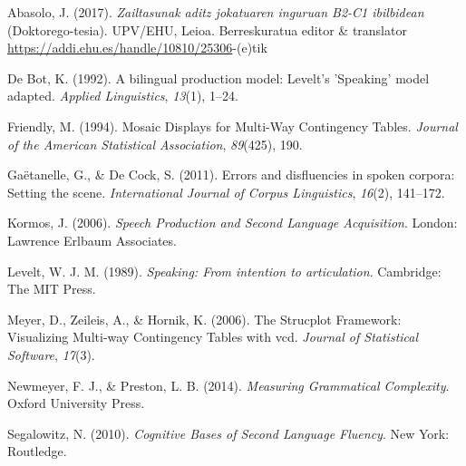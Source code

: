 \documentclass[]{article}
\begin{document}
\hypertarget{ref-abasolo_zailtasunak_2017}{}
Abasolo, J. (2017). \emph{Zailtasunak aditz jokatuaren inguruan B2-C1
ibilbidean} (Doktorego-tesia). UPV/EHU, Leioa. Berreskuratua editor \&
translator \url{https://addi.ehu.es/handle/10810/25306}-(e)tik

\hypertarget{ref-de_bot_bilingual_1992}{}
De Bot, K. (1992). A bilingual production model: Levelt's 'Speaking'
model adapted. \emph{Applied Linguistics}, \emph{13}(1), 1--24.

\hypertarget{ref-friendly_mosaic_1994}{}
Friendly, M. (1994). Mosaic Displays for Multi-Way Contingency Tables.
\emph{Journal of the American Statistical Association}, \emph{89}(425),
190.

\hypertarget{ref-gaetanelle_errors_2011}{}
Gaëtanelle, G., \& De Cock, S. (2011). Errors and disfluencies in spoken
corpora: Setting the scene. \emph{International Journal of Corpus
Linguistics}, \emph{16}(2), 141--172.

\hypertarget{ref-kormos_speech_2006}{}
Kormos, J. (2006). \emph{Speech Production and Second Language
Acquisition}. London: Lawrence Erlbaum Associates.

\hypertarget{ref-levelt_speaking:_1989}{}
Levelt, W. J. M. (1989). \emph{Speaking: From intention to
articulation}. Cambridge: The MIT Press.

\hypertarget{ref-meyer_strucplot_2006}{}
Meyer, D., Zeileis, A., \& Hornik, K. (2006). The Strucplot Framework:
Visualizing Multi-way Contingency Tables with vcd. \emph{Journal of
Statistical Software}, \emph{17}(3).

\hypertarget{ref-newmeyer_measuring_2014}{}
Newmeyer, F. J., \& Preston, L. B. (2014). \emph{Measuring Grammatical
Complexity}. Oxford University Press.

\hypertarget{ref-segalowitz_cognitive_2010}{}
Segalowitz, N. (2010). \emph{Cognitive Bases of Second Language
Fluency}. New York: Routledge.
\end{document}
